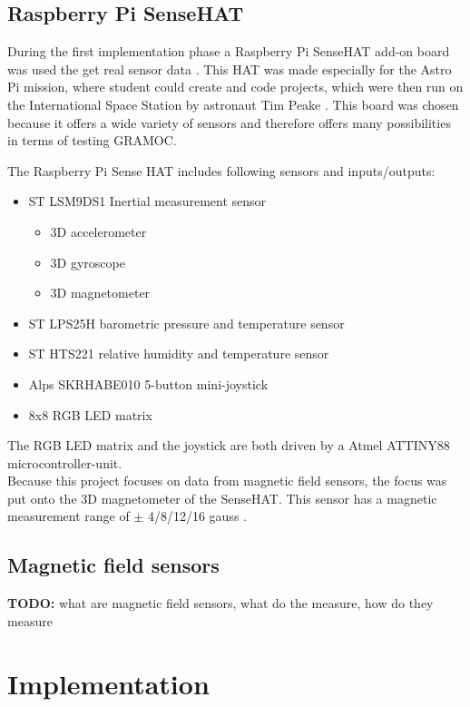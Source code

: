 \subsection{Raspberry Pi SenseHAT}

During the first implementation phase a Raspberry Pi SenseHAT add-on board was used the get real sensor data \cite{SenseHAT}. This HAT was made especially for the Astro Pi mission, where student could create and code projects, which were then run on the International Space Station by astronaut Tim Peake \cite{AstroPiMission}. This board was chosen because it offers a wide variety of sensors and therefore offers many possibilities in terms of testing GRAMOC.

The Raspberry Pi Sense HAT includes following sensors and inputs/outputs:

\begin{itemize}
	\item ST LSM9DS1 Inertial measurement sensor
		\begin{itemize}
			\item 3D accelerometer
			\item 3D gyroscope
			\item 3D magnetometer
		\end{itemize}
	\item ST LPS25H barometric pressure and temperature sensor
	\item ST HTS221 relative humidity and temperature sensor
	\item Alps SKRHABE010 5-button mini-joystick
	\item 8x8 RGB LED matrix
\end{itemize}
\bigskip
The RGB LED matrix and the joystick are both driven by a Atmel ATTINY88 microcontroller-unit.\\
Because this project focuses on data from magnetic field sensors, the focus was put onto the 3D magnetometer of the SenseHAT. This sensor has a magnetic measurement range of $\pm$ 4/8/12/16 gauss \cite{InertialSensorsManual}.

\subsection{Magnetic field sensors}

\textbf{TODO:} what are magnetic field sensors, what do the measure, how do they measure

\section{Implementation}

